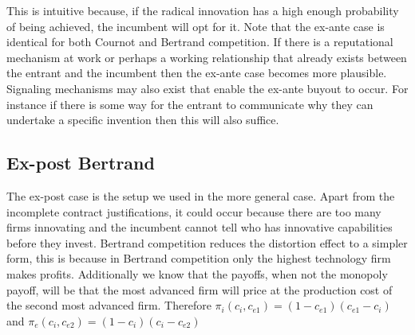 \documentclass[12pt]{report}
\numberwithin{equation}{section}
\begin{document}
This is intuitive because, if the radical innovation has a high enough probability of being achieved, the incumbent will opt for it. Note that the ex-ante case is identical for both Cournot and Bertrand competition. If there is a reputational mechanism at work or perhaps a working relationship that already exists between the entrant and the incumbent then the ex-ante case becomes more plausible. Signaling mechanisms may also exist that enable the ex-ante buyout to occur. For instance if there is some way for the entrant to communicate why they can undertake a specific invention then this will also suffice.

\subsection{Ex-post Bertrand}
The ex-post case is the setup we used in the more general case. Apart from the incomplete contract justifications, it could occur because there are too many firms innovating and the incumbent cannot tell who has innovative capabilities before they invest. Bertrand competition reduces the distortion effect to a simpler form, this is because in Bertrand competition only the highest technology firm makes profits. Additionally we know that the payoffs, when not the monopoly payoff, will be that the most advanced firm will price at the production cost of the second most advanced firm. Therefore $\pi_i(c_i,c_{e1})= (1-c_{e1})(c_{e1}-c_i)$ and $\pi_e(c_i,c_{e2})= (1-c_{i})(c_{i}-c_{e2})$

 
\end{document}
